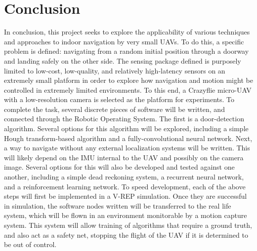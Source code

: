 \documentclass[12pt]{article}
\begin{document}
\section{Conclusion}
In conclusion, this project seeks to explore the applicability of various techniques and approaches to indoor navigation by very small UAVs. To do this, a specific problem is defined: navigating from a random initial position through a doorway and landing safely on the other side. The sensing package defined is purposely limited to low-cost, low-quality, and relatively high-latency sensors on an extremely small platform in order to explore how navigation and motion might be controlled in extremely limited environments. To this end, a Crazyflie micro-UAV with a low-resolution camera is selected as the platform for experiments. To complete the task, several discrete pieces of software will be written, and connected through the Robotic Operating System. The first is a door-detection algorithm. Several options for this algorithm will be explored, including a simple Hough transform-based algorithm and a fully-convolutional neural network. Next, a way to navigate without any external localization systems will be written. This will likely depend on the IMU internal to the UAV and possibly on the camera image. Several options for this will also be developed and tested against one another, including a simple dead reckoning system, a recurrent neural network, and a reinforcement learning network. To speed development, each of the above steps will first be implemented in a V-REP simulation. Once they are successful in simulation, the software nodes written will be transferred to the real life system, which will be flown in an environment monitorable by a motion capture system. This system will allow training of algorithms that require a ground truth, and also act as a safety net, stopping the flight of the UAV if it is determined to be out of control.





\end{document}
